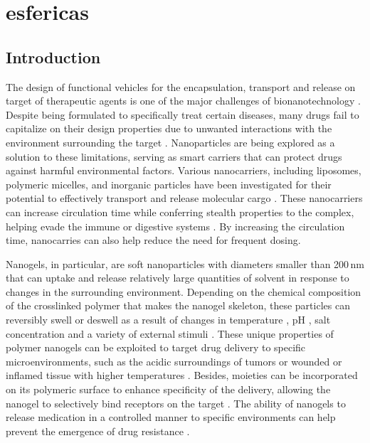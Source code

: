 \chapter{esfericas}

\section{Introduction}


The design of functional vehicles for the encapsulation, transport and release on target of therapeutic agents is one of the major challenges of bionanotechnology \addcite[ye2018review].
Despite being formulated to specifically treat certain diseases, many drugs fail to capitalize on their design properties due to  unwanted interactions with the environment surrounding the target .
Nanoparticles are being explored as a solution to these limitations, serving as smart carriers that can  protect drugs against harmful environmental factors.
Various nanocarriers, including liposomes, polymeric micelles, and inorganic particles have been investigated for their potential to effectively transport and release molecular cargo .
These nanocarriers can increase circulation time while conferring stealth properties to the complex, helping evade the immune or digestive systems .
By increasing the circulation time, nanocarries can also help reduce the need for frequent dosing.






Nanogels, in particular, are soft nanoparticles with diameters smaller than 200\,nm that can uptake and release relatively large quantities of solvent in response to changes in the surrounding environment.
Depending on the chemical composition of the crosslinked polymer that makes the nanogel skeleton, these particles can reversibly swell or deswell as a result of changes in temperature , pH , salt concentration  and a variety of external stimuli .
These unique properties of polymer nanogels can be exploited to target drug delivery to specific microenvironments, such as the acidic surroundings of tumors  or wounded or inflamed tissue with higher temperatures \addcite[wu2010core].
Besides, moieties can be incorporated on its polymeric surface to enhance specificity of the delivery, allowing the nanogel to selectively bind receptors on the target .
The ability of nanogels to release medication in a controlled manner to specific environments can help prevent the emergence of drug resistance .








